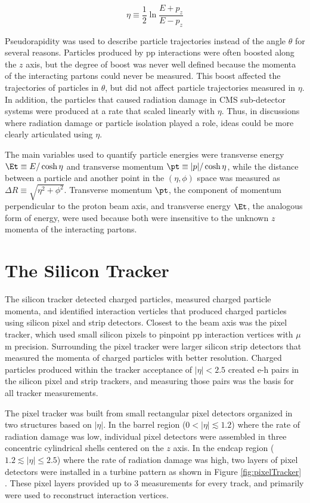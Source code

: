 \begin{equation}
	\eta \equiv \frac{1}{2}\ln{\frac{E+p_{z}}{E-p_{z}}}
\end{equation}

Pseudorapidity was used to describe particle trajectories instead of the angle $\theta$ for several reasons.  Particles 
produced by pp interactions were often boosted along the $z$ axis, but the degree of boost was never well 
defined because the momenta of the interacting partons could never be measured.  This boost affected the 
trajectories of particles in $\theta$, but did not affect particle trajectories measured in $\eta$.  In 
addition, the particles that caused radiation damage in CMS sub-detector systems were produced at 
a rate that scaled linearly with $\eta$.  Thus, in discussions where radiation damage or particle 
isolation played a role, ideas could be more clearly articulated using $\eta$.

The main variables used to quantify particle energies were transverse energy 
$\Et \equiv E/\cosh{\eta}$ and transverse momentum $\pt \equiv |p|/\cosh{\eta}$, while the distance between 
a particle and another point in the $(\eta, \phi)$ space was measured as $\Delta R \equiv \sqrt{\eta^{2} + \phi^{2}}$.  
Transverse momentum $\pt$, the component of momentum perpendicular to the proton beam axis, and transverse energy $\Et$, the 
analogous form of energy, were used because both were insensitive to the unknown $z$ momenta of the interacting partons.  

\section{The Silicon Tracker}
\label{sec:siTrackerDescription}
The silicon tracker detected charged particles, measured charged particle momenta, and identified interaction 
verticles that produced charged particles using silicon pixel and strip detectors.  Closest 
to the beam axis was the pixel tracker, which used small silicon pixels to pinpoint pp interaction vertices 
with $\mu$m precision.  Surrounding the pixel tracker were larger silicon strip detectors that measured the 
momenta of charged particles with better resolution.  Charged particles produced within the tracker acceptance of $|\eta| < 2.5$ created 
e-h pairs in the silicon pixel and strip trackers, and measuring those pairs was the basis for all tracker 
measurements.

The pixel tracker was built from small rectangular pixel detectors organized in two 
structures based on $|\eta|$.  In the barrel region ($0 < |\eta| \lesssim 1.2$) where the rate of radiation damage was 
low, individual pixel detectors were assembled in three concentric cylindrical shells centered on the $z$ axis.  In 
the endcap region ($1.2 \lesssim |\eta| \leq 2.5$) where the rate of radiation damage was high, two layers of pixel detectors were 
installed in a turbine pattern as shown in Figure \ref{fig:pixelTracker} \cite{pixelCommissioning}.  These pixel 
layers provided up to 3 measurements for every track, and primarily were used to reconstruct interaction 
vertices.

